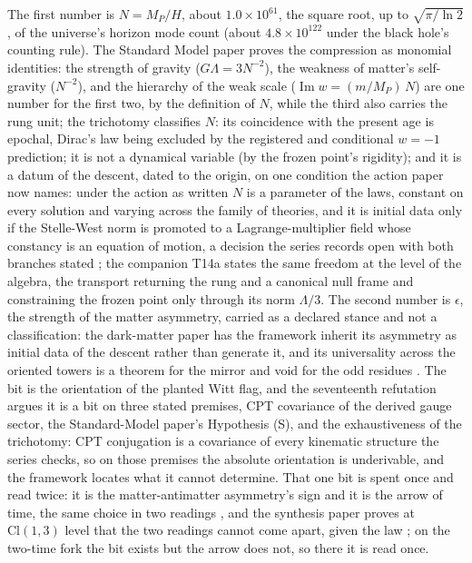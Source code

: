 \documentclass[11pt]{article}
\theoremstyle{definition}
\theoremstyle{plain}
\providecommand{\Cl}{}\renewcommand{\Cl}{\mathrm{Cl}}
\begin{document}
The first number is $N = M_{P}/H$, about $1.0 \times 10^{61}$, the square root, up to $\sqrt{\pi/\ln 2}$, of the universe's horizon mode count (about $4.8 \times 10^{122}$ under the black hole's counting rule). The Standard Model paper proves the compression as monomial identities: the strength of gravity ($G\Lambda = 3N^{-2}$), the weakness of matter's self-gravity ($N^{-2}$), and the hierarchy of the weak scale ($\operatorname{Im} w = (m/M_{P})\,N$) are one number for the first two, by the definition of $N$, while the third also carries the rung unit; the trichotomy classifies $N$: its coincidence with the present age is epochal, Dirac's law being excluded by the registered and conditional $w = -1$ prediction; it is not a dynamical variable (by the frozen point's rigidity); and it is a datum of the descent, dated to the origin, on one condition the action paper now names: under the action as written $N$ is a parameter of the laws, constant on every solution and varying across the family of theories, and it is initial data only if the Stelle-West norm is promoted to a Lagrange-multiplier field whose constancy is an equation of motion, a decision the series records open with both branches stated \cite{ButlerT12, ButlerT10}; the companion T14a \cite{ButlerT14a} states the same freedom at the level of the algebra, the transport returning the rung and a canonical null frame and constraining the frozen point only through its norm $\Lambda/3$. The second number is $\epsilon$, the strength of the matter asymmetry, carried as a declared stance and not a classification: the dark-matter paper has the framework inherit its asymmetry as initial data of the descent rather than generate it, and its universality across the oriented towers is a theorem for the mirror and void for the odd residues \cite{ButlerT14}. The bit is the orientation of the planted Witt flag, and the seventeenth refutation argues it is a bit on three stated premises, CPT covariance of the derived gauge sector, the Standard-Model paper's Hypothesis (S), and the exhaustiveness of the trichotomy: CPT conjugation is a covariance of every kinematic structure the series checks, so on those premises the absolute orientation is underivable, and the framework locates what it cannot determine. That one bit is spent once and read twice: it is the matter-antimatter asymmetry's sign and it is the arrow of time, the same choice in two readings \cite{ButlerT14}, and the synthesis paper proves at $\Cl(1,3)$ level that the two readings cannot come apart, given the law \cite{ButlerT16}; on the two-time fork the bit exists but the arrow does not, so there it is read once.
\end{document}
